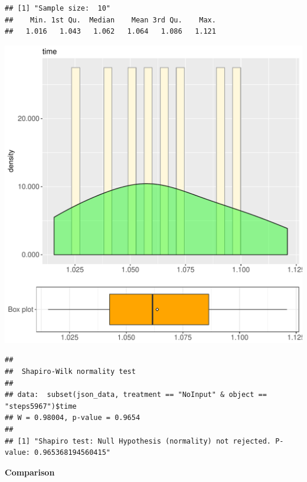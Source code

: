 \documentclass{article}\usepackage[]{graphicx}\usepackage[]{color}
\makeatletter
\def\maxwidth{ %
  \ifdim\Gin@nat@width>\linewidth
    \linewidth
  \else
    \Gin@nat@width
  \fi
}
\newenvironment{kframe}{%
 \def\at@end@of@kframe{}%
 \ifinner\ifhmode%
  \def\at@end@of@kframe{\end{minipage}}%
  \begin{minipage}{\columnwidth}%
 \fi\fi%
 \def\FrameCommand##1{\hskip\@totalleftmargin \hskip-\fboxsep
 \colorbox{shadecolor}{##1}\hskip-\fboxsep
     \hskip-\linewidth \hskip-\@totalleftmargin \hskip\columnwidth}%
 \MakeFramed {\advance\hsize-\width
   \@totalleftmargin\z@ \linewidth\hsize
   \@setminipage}}%
 {\par\unskip\endMakeFramed%
 \at@end@of@kframe}
\newenvironment{knitrout}{}{} %
\makeatother
\begin{document}
\begin{knitrout}
\color{fgcolor}\begin{kframe}
\begin{verbatim}
## [1] "Sample size:  10"
##    Min. 1st Qu.  Median    Mean 3rd Qu.    Max. 
##   1.016   1.043   1.062   1.064   1.086   1.121
\end{verbatim}
\end{kframe}
\includegraphics[width=\maxwidth]{figure/RH4_NoInput_steps5967-1} 
\begin{kframe}\begin{verbatim}
## 
## 	Shapiro-Wilk normality test
## 
## data:  subset(json_data, treatment == "NoInput" & object == "steps5967")$time
## W = 0.98004, p-value = 0.9654
## 
## [1] "Shapiro test: Null Hypothesis (normality) not rejected. P-value: 0.965368194560415"
\end{verbatim}
\end{kframe}
\end{knitrout}
  
 \textbf{Comparison}
  
\end{document}
